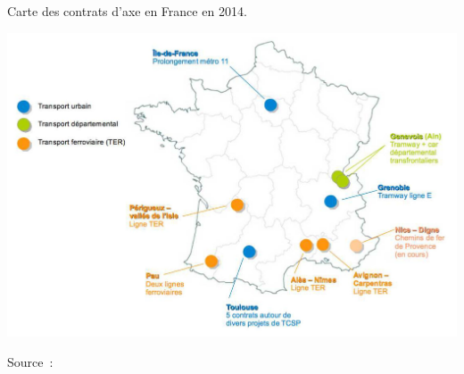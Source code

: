 \begin{refsegment}
    \begin{carte}[h!]\vspace*{4pt}
        \caption{Carte des contrats d'axe en France en 2014.}
        \label{fig-chap1:carte-contrats-axe-france}
        \centerline{\includegraphics[width=0.75\columnwidth]{src/Figures/Chap-1/Carte_contrats_axe.jpg}}
        \vspace{5pt}
        \begin{flushright}\scriptsize{
        Source~: \textcolor{blue}{\textcite[18]{bentayou_contrat_2015}}
        }\end{flushright}
    \end{carte}


\end{refsegment}
